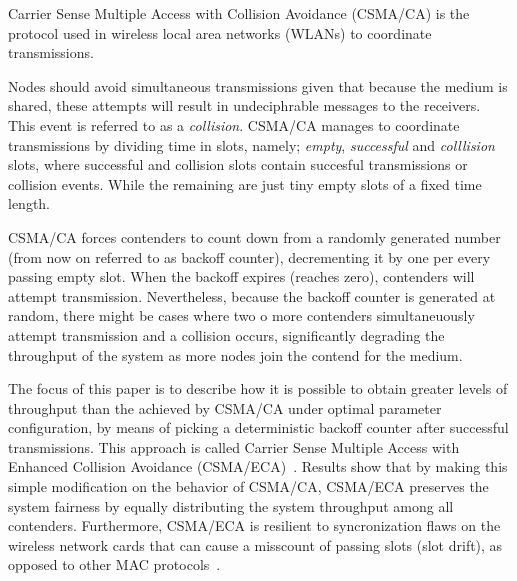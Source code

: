 Carrier Sense Multiple Access with Collision Avoidance (CSMA/CA) is the protocol used in wireless local area networks (WLANs) to coordinate transmissions.

Nodes should avoid simultaneous transmissions given that because the medium is shared, these attempts will result in undeciphrable messages to the receivers. This event is referred to as a \emph{collision}. CSMA/CA manages to coordinate transmissions by dividing time in slots, namely; \emph{empty}, \emph{successful} and \emph{colllision} slots, where successful and collision slots contain succesful transmissions or collision events. While the remaining are just tiny empty slots of a fixed time length.

CSMA/CA forces contenders to count down from a randomly generated number (from now on referred to as backoff counter), decrementing it by one per every passing empty slot. When the backoff expires (reaches zero), contenders will attempt transmission. Nevertheless, because the backoff counter is generated at random, there might be cases where two o more contenders simultaneuously attempt transmission and a collision occurs, significantly degrading the throughput of the system as more nodes join the contend for the medium.

The focus of this paper is to describe how it is possible to obtain greater levels of throughput than the achieved by CSMA/CA under optimal parameter configuration, by means of picking a deterministic backoff counter after successful transmissions. This approach is called Carrier Sense Multiple Access with Enhanced Collision Avoidance (CSMA/ECA)~\cite{CSMA_ECA}. Results show that by making this simple modification on the behavior of CSMA/CA, CSMA/ECA preserves the system fairness by equally distributing the system throughput among all contenders. Furthermore, CSMA/ECA is resilient to syncronization flaws on the wireless network cards that can cause a misscount of passing slots (slot drift), as opposed to other MAC protocols~\cite{slotDrift}.
